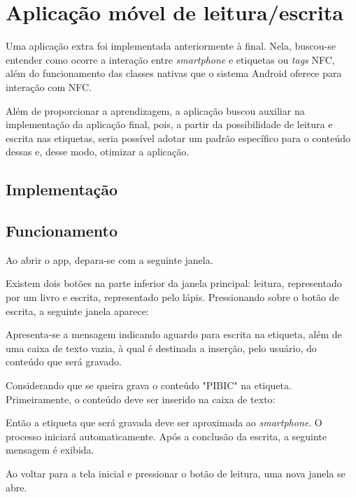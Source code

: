 \documentclass[
	article,			%
	12pt,				%
	oneside,			%
	a4paper,			%
	english,			%
	brazil,				%
	sumario=tradicional
	]{abntex2}
\begin{document}
\section{Aplicação móvel de leitura/escrita}

Uma aplicação extra foi implementada anteriormente à final. Nela, buscou-se entender como ocorre a interação entre \textit{smartphone} e etiquetas ou \textit{tags} NFC, além do funcionamento das classes nativas que o sistema Android oferece para interação com NFC. 

Além de proporcionar a aprendizagem, a aplicação buscou auxiliar na implementação da aplicação final, pois, a partir da possibilidade de leitura e escrita nas etiquetas, seria possível adotar um padrão específico para o conteúdo dessas e, desse modo, otimizar a aplicação.

\subsection{Implementação}



\subsection{Funcionamento}

Ao abrir o app, depara-se com a seguinte janela.



Existem dois botões na parte inferior da janela principal: leitura, representado por um livro e escrita, representado pelo lápis.  Pressionando sobre o botão de escrita, a seguinte janela aparece:


Apresenta-se a mensagem indicando aguardo para escrita na etiqueta, além de uma caixa de texto vazia, à qual é destinada a inserção, pelo usuário, do conteúdo que será gravado.

Considerando que se queira grava o conteúdo "PIBIC" na etiqueta. Primeiramente, o conteúdo deve ser inserido na caixa de texto:


Então a etiqueta que será gravada deve ser aproximada ao \textit{smartphone}. O processo iniciará automaticamente. Após a conclusão da escrita, a seguinte mensagem é exibida.



Ao voltar para a tela inicial e pressionar o botão de leitura, uma nova janela se abre.
\end{document}
